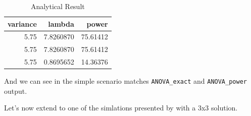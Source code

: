 \documentclass[
]{book}
\begin{document}
\begin{table}[!h]

\caption{\label{tab:unnamed-chunk-139}Analytical Result}
\centering
\begin{tabular}[t]{r|r|r}
\hline
variance & lambda & power\\
\hline
5.75 & 7.8260870 & 75.61412\\
\hline
5.75 & 7.8260870 & 75.61412\\
\hline
5.75 & 0.8695652 & 14.36376\\
\hline
\end{tabular}
\end{table}

And we can see in the simple scenario matches \texttt{ANOVA\_exact} and \texttt{ANOVA\_power} output.

Let's now extend to one of the simlations presented by \citet{potvin2000statistical} with a 3x3 solution.
\end{document}
